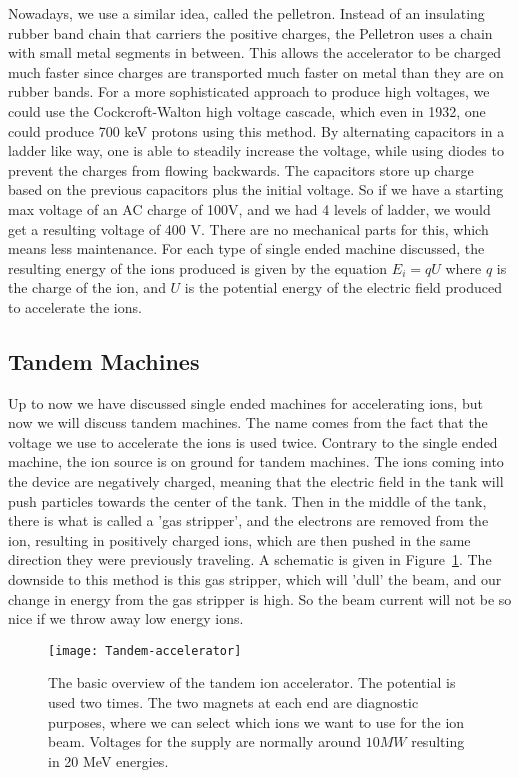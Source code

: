 Nowadays, we use a similar idea, called the pelletron.
Instead of an insulating rubber band chain that carriers the positive charges, the Pelletron uses a chain with small metal segments in between.
This allows the accelerator to be charged much faster since charges are transported much faster on metal than they are on rubber bands.
For a more sophisticated approach to produce high voltages, we could use the Cockcroft-Walton high voltage cascade, which even in 1932, one could produce 700 keV protons using this method.
By alternating capacitors in a ladder like way, one is able to steadily increase the voltage, while using diodes to prevent the charges from flowing backwards.
The capacitors store up charge based on the previous capacitors plus the initial voltage.
So if we have a starting max voltage of an AC charge of 100V, and we had 4 levels of ladder, we would get a resulting voltage of 400 V.
There are no mechanical parts for this, which means less maintenance.
For each type of single ended machine discussed, the resulting energy of the ions produced is given by the equation $E_i = qU$ where $q$ is the charge of the ion, and $U$ is the potential energy of the electric field produced to accelerate the ions.

\subsection{Tandem Machines}\label{subsec:tandem-machines}

Up to now we have discussed single ended machines for accelerating ions, but now we will discuss tandem machines.
The name comes from the fact that the voltage we use to accelerate the ions is used twice.
Contrary to the single ended machine, the ion source is on ground for tandem machines.
The ions coming into the device are negatively charged, meaning that the electric field in the tank will push particles towards the center of the tank.
Then in the middle of the tank, there is what is called a 'gas stripper', and the electrons are removed from the ion, resulting in positively charged ions, which are then pushed in the same direction they were previously traveling.
A schematic is given in Figure~\ref{fig:tandem}.
The downside to this method is this gas stripper, which will 'dull' the beam, and our change in energy from the gas stripper is high.
So the beam current will not be so nice if we throw away low energy ions.
\begin{figure}
	\centering
	\texttt{[image: Tandem-accelerator]}
	\caption{The basic overview of the tandem ion accelerator. The potential is used two times. The two magnets at each end are diagnostic purposes, where we can select which ions we want to use for the ion beam. Voltages for the supply are normally around $10 MW$ resulting in 20 MeV energies. }
	\label{fig:tandem}
\end{figure}



